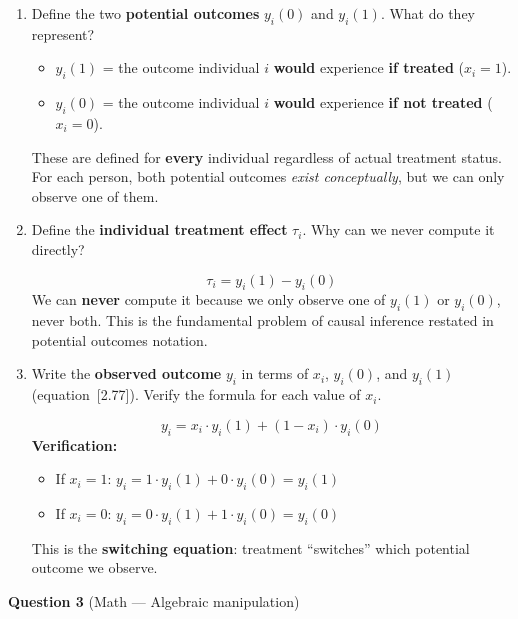\documentclass[11pt,a4paper]{article}
\begin{document}
\begin{enumerate}[label=(\alph*)]
\item Define the two \textbf{potential outcomes} $y_i(0)$ and $y_i(1)$. What do they represent?

\begin{solution}
\begin{itemize}
  \item $y_i(1)$ = the outcome individual $i$ \textbf{would} experience \textbf{if treated} ($x_i = 1$).
  \item $y_i(0)$ = the outcome individual $i$ \textbf{would} experience \textbf{if not treated} ($x_i = 0$).
\end{itemize}
These are defined for \textbf{every} individual regardless of actual treatment status. For each person, both potential outcomes \emph{exist conceptually}, but we can only observe one of them.
\end{solution}

\item Define the \textbf{individual treatment effect} $\tau_i$. Why can we never compute it directly?

\begin{solution}
\[
  \tau_i = y_i(1) - y_i(0)
\]
We can \textbf{never} compute it because we only observe one of $y_i(1)$ or $y_i(0)$, never both. This is the fundamental problem of causal inference restated in potential outcomes notation.
\end{solution}

\item Write the \textbf{observed outcome} $y_i$ in terms of $x_i$, $y_i(0)$, and $y_i(1)$ (equation~[2.77]). Verify the formula for each value of $x_i$.

\begin{solution}
\[
  y_i = x_i \cdot y_i(1) + (1 - x_i)\cdot y_i(0)
\]
\textbf{Verification:}
\begin{itemize}
  \item If $x_i = 1$: $y_i = 1 \cdot y_i(1) + 0 \cdot y_i(0) = y_i(1)$ \checkmark
  \item If $x_i = 0$: $y_i = 0 \cdot y_i(1) + 1 \cdot y_i(0) = y_i(0)$ \checkmark
\end{itemize}
This is the \textbf{switching equation}: treatment ``switches'' which potential outcome we observe.
\end{solution}
\end{enumerate}

\bigskip
\textbf{Question 3} (Math --- Algebraic manipulation)
\end{document}
